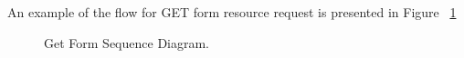 An example of the flow for GET form resource request is presented in Figure ~\ref{fig:getForm_Sequence_Diagram}

\begin{figure}[h]
	\begin{center}
	\end{center}
	\caption{Get Form Sequence Diagram.}\label{fig:getForm_Sequence_Diagram}
\end{figure}








%




